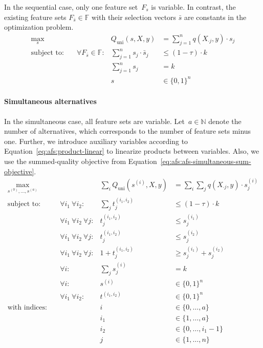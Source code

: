 \documentclass{article}
\theoremstyle{definition}
\begin{document}
In the sequential case, only one feature set~$F_s$ is variable.
In contrast, the existing feature sets $F_{\bar{s}} \in \mathbb{F}$ with their selection vectors $\bar{s}$ are constants in the optimization problem.
%
\begin{equation}
	\begin{aligned}
		\max_s &\quad & Q_{\text{uni}}(s,X,y) &= \sum_{j=1}^{n} q(X_{\cdot{}j},y) \cdot s_j \\
		\text{subject to:} &\quad \forall F_{\bar{s}} \in \mathbb{F}: & \sum_{j=1}^n s_j \cdot \bar{s}_j &\leq (1 - \tau) \cdot k \\
		&\quad & \sum_{j=1}^n s_j &= k \\
		&\quad & s &\in \{0,1\}^n
	\end{aligned}
	\label{eq:afs:afs-sequential-complete}
\end{equation}
%
\paragraph{Simultaneous alternatives}

In the simultaneous case, all feature sets are variable.
Let~$a \in \mathbb{N}$ denote the number of alternatives, which corresponds to the number of feature sets minus one.
Further, we introduce auxiliary variables according to Equation~\ref{eq:afs:product-linear} to linearize products between variables.
Also, we use the summed-quality objective from Equation~\ref{eq:afs:afs-simultaneous-sum-objective}.
%
\begin{equation}
	\begin{aligned}
		\max_{s^{(0)}, \dots, s^{(a)}} &\quad & \sum_i Q_{\text{uni}}(s^{(i)},X,y) &= \sum_i \sum_j q(X_{\cdot{}j},y) \cdot s^{(i)}_j\\
		\text{subject to:} &\quad \forall i_1~\forall i_2: & \sum_j t^{(i_1,i_2)}_j &\leq (1 - \tau) \cdot k \\
		&\quad \forall i_1~\forall i_2~\forall j: & t^{(i_1,i_2)}_j &\leq s^{(i_1)}_j \\
		&\quad \forall i_1~\forall i_2~\forall j: & t^{(i_1,i_2)}_j &\leq s^{(i_2)}_j \\
		&\quad \forall i_1~\forall i_2~\forall j: & 1 + t^{(i_1,i_2)}_j &\geq s^{(i_1)}_j + s^{(i_2)}_j \\
		&\quad \forall i: & \sum_j s^{(i)}_j &= k \\
		&\quad \forall i: & s^{(i)} &\in \{0,1\}^n \\
		&\quad \forall i_1~\forall i_2: & t^{(i_1,i_2)} &\in \{0,1\}^n \\
		\text{with indices:} &\quad & i &\in \{0, \dots, a\} \\
		&\quad & i_1 &\in \{1, \dots, a\} \\
		&\quad & i_2 &\in \{0, \dots, i_1-1\} \\
		&\quad & j &\in \{1, \dots, n\}
	\end{aligned}
	\label{eq:afs:afs-simultaneous-complete}
\end{equation}
\end{document}
